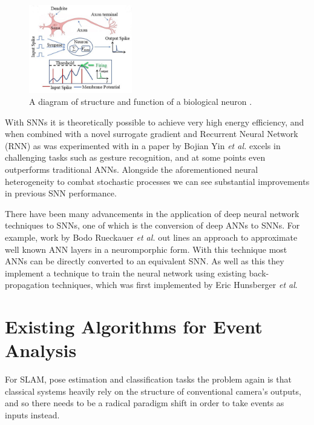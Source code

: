 \begin{figure}[htb]
      \centering
      \includegraphics[width=0.4\textwidth]{background/images/biological_neuron.png}
      \caption{A diagram of structure and function of a biological neuron \cite{BiologicalNeuronModel}.}
      \label{fig:biological_neuron}
\end{figure}

With SNNs it is theoretically possible to achieve very high energy efficiency, and when combined with a novel surrogate gradient and Recurrent Neural Network (RNN) as was experimented with in a paper by Bojian Yin \textit{et al.}\cite{EfficientSNN} excels in challenging tasks such as gesture recognition, and at some points even outperforms traditional ANNs. Alongside the aforementioned neural heterogeneity to combat stochastic processes we can see substantial improvements in previous SNN performance. 

There have been many advancements in the application of deep neural network techniques to SNNs, one of which is the conversion of deep ANNs to SNNs. For example, work by Bodo Rueckauer \textit{et al.}\cite{Ann2Snn} out lines an approach to approximate well known ANN layers in a neuromporphic form. With this technique most ANNs can be directly converted to an equivalent SNN. As well as this they implement a technique to train the neural network using existing back-propagation techniques, which was first implemented by Eric Hunsberger \textit{et al}\cite{TrainingSnn}.

\section{Existing Algorithms for Event Analysis} \label{sec:existing_algorithms}

For SLAM, pose estimation and classification tasks the problem again is that classical systems heavily rely on the structure of conventional camera's outputs, and so there needs to be a radical paradigm shift in order to take events as inputs instead.

